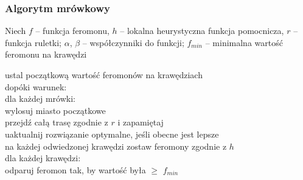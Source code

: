 \documentclass{beamer}
\begin{document}
\begin{frame}
\frametitle{Algorytm mrówkowy}
\iffalse 
\item Każda mrówka po danej iteracji zostawia na krawędziach feromon o wartości f \\
\item Z funckją feromonu jest związany współczynnik $\alpha$, który mówi nam jak bardzo mrówki będą w swoich wyborach uwzględniać wartość feromonu na krawędziach. \\
\item Funkcja ruletki jest wykorzystywana do wyboru kolejnego miasta do odwiedzenia na trasie.\\
\item Współczynnik parowania - stała z przedziału $(0,1)$ \\
\item Minimalna ilość feromonu na krawędzi - zabezpieczenie przed utratą danych o danej krawędzi \\
\item Liczba mrówek - wybierana na początku \\
\fi

Niech $f$ -- funkcja feromonu, $h$ -- lokalna heurystyczna funkcja pomocnicza, $r$ -- funkcja ruletki; $\alpha$, $\beta$ -- współczynniki do funkcji; $f_{min}$ -- minimalna wartość feromonu na krawędzi

ustal początkową wartość feromonów na krawędziach \\
dopóki warunek: \\
\hspace{0.5cm}  dla każdej mrówki: \\
\hspace{1cm}    wylosuj miasto początkowe \\
\hspace{1cm}    przejdź całą trasę zgodnie z $r$ i zapamiętaj \\
\hspace{1cm}    uaktualnij rozwiązanie optymalne, jeśli obecne jest lepsze \\
\hspace{1cm}    na każdej odwiedzonej krawędzi zostaw feromony zgodnie z $h$ \\
\hspace{0.5cm}  dla każdej krawędzi: \\
\hspace{1cm}    odparuj feromon tak, by wartość była  $\geq$ $f_{min}$


\end{frame}
\end{document}
